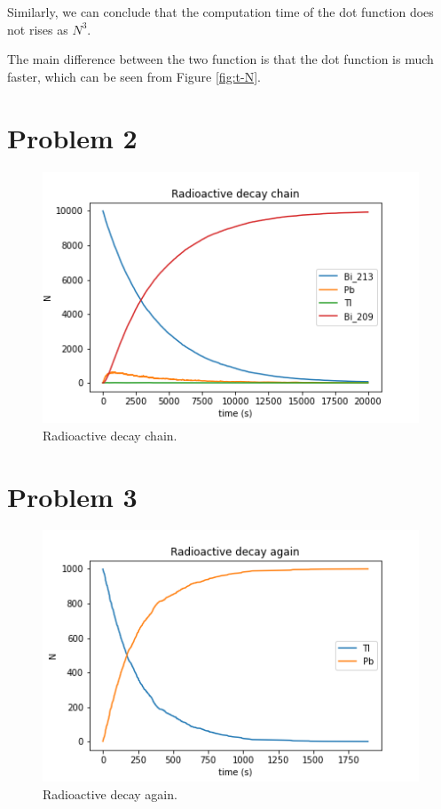\documentclass[11pt]{article}
\begin{document}
Similarly, we can conclude that the computation time of the dot function does not rises as $N^3$.

The main difference between the two function is that the dot function is much faster, which can be seen from Figure \ref{fig:t-N}.

\section{Problem 2}
\begin{figure}[H]
    \centering
    \includegraphics[scale = 1.0]{images/ps-3-2.png}
    \caption{Radioactive decay chain.}
\end{figure}

\section{Problem 3}
\begin{figure}[H]
    \centering
    \includegraphics[scale = 1.0]{images/ps-3-3.png}
    \caption{Radioactive decay again.}
\end{figure}
\end{document}
